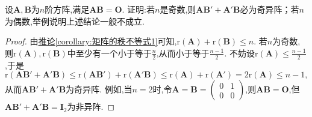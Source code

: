 \documentclass[../../main.tex]{subfiles}%
\begin{document}
\begin{example}
设\(\boldsymbol{A},\boldsymbol{B}\)为\(n\)阶方阵,满足\(\boldsymbol{A}\boldsymbol{B}=\boldsymbol{O}\). 证明:若\(n\)是奇数,则\(\boldsymbol{A}\boldsymbol{B}'+\boldsymbol{A}'\boldsymbol{B}\)必为奇异阵；若\(n\)为偶数,举例说明上述结论一般不成立.
\end{example}
\begin{proof}
由\hyperref[corollary:矩阵的秩不等式1]{推论\ref{corollary:矩阵的秩不等式1}}可知,\(\mathrm{r}(\boldsymbol{A})+\mathrm{r}(\boldsymbol{B})\leqslant  n\). 若\(n\)为奇数,则\(\mathrm{r}(\boldsymbol{A}),\mathrm{r}(\boldsymbol{B})\)中至少有一个小于等于\(\frac{n}{2}\),从而小于等于\(\frac{n - 1}{2}\). 不妨设\(\mathrm{r}(\boldsymbol{A})\leqslant \frac{n - 1}{2}\),于是
\[
\mathrm{r}(\boldsymbol{A}\boldsymbol{B}'+\boldsymbol{A}'\boldsymbol{B})\leqslant \mathrm{r}(\boldsymbol{A}\boldsymbol{B}')+\mathrm{r}(\boldsymbol{A}'\boldsymbol{B})\leqslant \mathrm{r}(\boldsymbol{A})+\mathrm{r}(\boldsymbol{A}') = 2\mathrm{r}(\boldsymbol{A})\leqslant  n - 1,
\]
从而\(\boldsymbol{A}\boldsymbol{B}'+\boldsymbol{A}'\boldsymbol{B}\)为奇异阵. 例如,当\(n = 2\)时,令\(\boldsymbol{A}=\boldsymbol{B}=\begin{pmatrix}
0&1\\
0&0
\end{pmatrix}\),则\(\boldsymbol{A}\boldsymbol{B}=\boldsymbol{O}\),但\(\boldsymbol{A}\boldsymbol{B}'+\boldsymbol{A}'\boldsymbol{B}=\boldsymbol{I}_2\)为非异阵.

\end{proof}
\end{document}
